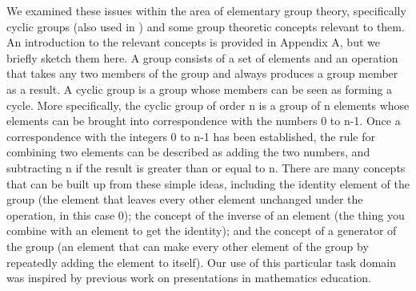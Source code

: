 \documentclass[man,10pt]{apa6}
\begin{document}
We examined these issues within the area of elementary group theory, specifically cyclic groups (also used in ) and some group theoretic concepts relevant to them. An introduction to the relevant concepts is provided in Appendix A, but we briefly sketch them here. A group consists of a set of elements and an operation that takes any two members of the group and always produces a group member as a result. A cyclic group is a group whose members can be seen as forming a cycle. More specifically, the cyclic group of order n is a group of n elements whose elements can be brought into correspondence with the numbers 0 to n-1. Once a correspondence with the integers 0 to n-1 has been established, the rule for combining two elements can be described as adding the two numbers, and subtracting n if the result is greater than or equal to n. There are many concepts that can be built up from these simple ideas, including the identity element of the group (the element that leaves every other element unchanged under the operation, in this case 0); the concept of the inverse of an element (the thing you combine with an element to get the identity); and the concept of a generator of the group (an element that can make every other element of the group by repeatedly adding the element to itself). Our use of this particular task domain was inspired by previous work on presentations in mathematics education. 
\end{document}
